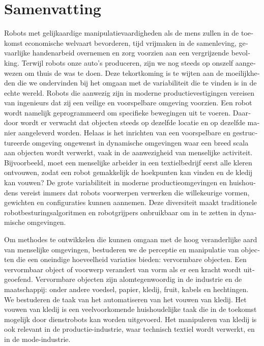 \documentclass[\home/main.tex]{subfiles}
\begin{document}
\chapter{Samenvatting}

\begin{otherlanguage}{dutch}

Robots met gelijkaardige manipulatievaardigheden als de mens zullen in de toekomst economische welvaart bevorderen, tijd vrijmaken in de samenleving, gevaarlijke handenarbeid overnemen en zorg voorzien aan een vergrijzende bevolking. 
Terwijl robots onze auto's produceren, zijn we nog steeds op onszelf aangewezen om thuis de was te doen.
Deze tekortkoming is te wijten aan de moeilijkheden die we ondervinden bij het omgaan met de variabiliteit die te vinden is in de echte wereld.
Robots die aanwezig zijn in moderne productievestigingen vereisen van ingenieurs dat zij een veilige en voorspelbare omgeving voorzien. Een robot wordt namelijk geprogrammeerd om specifieke bewegingen uit te voeren. Daardoor wordt er verwacht dat objecten steeds op dezelfde locatie en op dezelfde manier aangeleverd worden.
Helaas is het inrichten van een voorspelbare en gestructureerde omgeving ongewenst in dynamische omgevingen waar een breed scala aan objecten wordt verwerkt, vaak in de aanwezigheid van menselijke activiteit. Bijvoorbeeld, moet een menselijke arbeider in een textielbedrijf eerst alle kleren ontvouwen, zodat een robot gemakkelijk de hoekpunten kan vinden en de kledij kan vouwen?
De grote variabiliteit in moderne productieomgevingen en huishoudens vereist immers dat robots voorwerpen verwerken die willekeurige vormen, gewichten en configuraties kunnen aannemen. Deze diversiteit maakt traditionele robotbesturingsalgoritmen en robotgrijpers onbruikbaar om in te zetten in dynamische omgevingen.

Om methodes te ontwikkelen die kunnen omgaan met de hoog veranderlijke aard van menselijke omgevingen, bestuderen we de perceptie en manipulatie van objecten die een oneindige hoeveelheid variaties bieden: vervormbare objecten. Een vervormbaar object of voorwerp verandert van vorm als er een kracht wordt uitgeoefend. Vervormbare objecten zijn alomtegenwoordig in de industrie en de maatschappij: onder andere voedsel, papier, kledij, fruit, kabels en hechtingen. We bestuderen de taak van het automatiseren van het vouwen van kledij. Het vouwen van kledij is een veelvoorkomende huishoudelijke taak die in de toekomst mogelijk door dienstrobots kan worden uitgevoerd. Het manipuleren van kledij is ook relevant in de productie-industrie, waar technisch textiel wordt verwerkt, en in de mode-industrie.


\end{otherlanguage}
\end{document}
